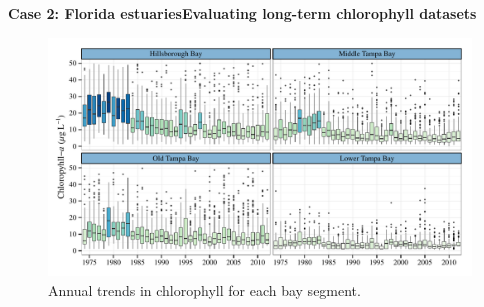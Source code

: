 \documentclass[serif]{beamer}\usepackage[]{graphicx}\usepackage[]{color}
\begin{document}
\begin{frame}{\textbf{Case 2: Florida estuaries}}{\textbf{Evaluating long-term chlorophyll datasets}}
\begin{figure}[!ht]

{\centering \includegraphics[width=\linewidth]{fig/annual_chl-1} 

}

\caption[Annual trends in chlorophyll for each bay segment]{Annual trends in chlorophyll for each bay segment.}\label{fig:annual_chl}
\end{figure}


\end{frame}

\end{document}
